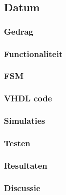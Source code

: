 \subsection{Datum}

\subsubsection{Gedrag}

\subsubsection{Functionaliteit}

\subsubsection{FSM}

\subsubsection{VHDL code}

\subsubsection{Simulaties}

\subsubsection{Testen}

\subsubsection{Resultaten}

\subsubsection{Discussie}
